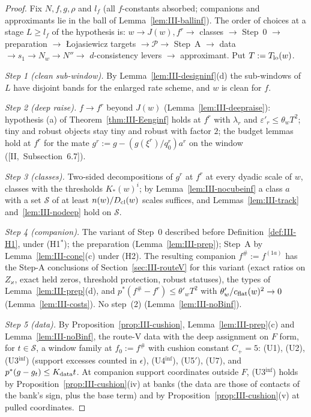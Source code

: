\documentclass[10pt]{amsart}
\theoremstyle{definition}
\theoremstyle{remark}
\begin{document}
\begin{proof}
Fix $N,f,g,\rho$ and $l_f$ (all $f$-constants absorbed; companions and
approximants lie in the ball of Lemma~\ref{lem:III-ballinf}).  The order of
choices at a stage $L\ge l_f$ of the hypothesis is: $w\to J(w),f^r\to$ classes
$\to$ Step~0 $\to$ preparation $\to$ \L ojasiewicz targets $\to\mathcal P\to$
Step~A $\to$ data $\to s_1\to N_w\to N''\to$ $d$-consistency levers $\to$
approximant.  Put $T:=T_{\rm lo}(w)$.

\emph{Step 1 (clean sub-window).}  By Lemma~\ref{lem:III-designinf}(d) the
sub-windows of $L$ have disjoint bands for the enlarged rate scheme, and $w$
is clean for $f$.

\emph{Step 2 (deep raise).}  $f\to f^r$ beyond $J(w)$
(Lemma~\ref{lem:III-deepraise}): hypothesis (a) of
Theorem~\ref{thm:III-Eenginf} holds at $f^r$ with $\lambda_r$ and
$\varepsilon'_r\le\theta_wT^2$; tiny and robust objects stay tiny and robust
with factor $2$; the budget lemmas hold at $f^r$ for the mate
$g^r:=g-(g(\xi^r)/q^r_0)a^r$ on the window ([II,~Subsection~6.7]).

\emph{Step 3 (classes).}  Two-sided decompositions of $g^r$ at $f^r$ at every
dyadic scale of $w$, classes with the thresholds $K_*(w)^i$; by
Lemma~\ref{lem:III-nocubeinf} a class $a$ with a set $\mathcal S$ of at least
$n(w)/D_{\rm cl}(w)$ scales suffices, and Lemmas~\ref{lem:III-track}
and~\ref{lem:III-nodeep} hold on $\mathcal S$.

\emph{Step 4 (companion).}  The variant of Step~0 described before
Definition~\ref{def:III-H1}, under (H1$^*$); the preparation
(Lemma~\ref{lem:III-prep}); Step~A by Lemma~\ref{lem:III-cone}(c) under (H2).
The resulting companion $f^\#:=f^{(1a)}$ has the Step-A conclusions of
Section~\ref{sec:III-routeV} for this variant (exact ratios on $Z_\varkappa$, exact held zeros,
threshold protection, robust statuses), the types of Lemma~\ref{lem:III-prep}(d),
and $p^*(f^\#-f^r)\le\theta'_wT^2$ with $\theta'_w/c_{\rm flat}(w)^2\to0$
(Lemma~\ref{lem:III-costs}).  No step~(2) (Lemma~\ref{lem:III-noBinf}).

\emph{Step 5 (data).}  By Proposition~\ref{prop:III-cushion},
Lemma~\ref{lem:III-prep}(c) and Lemma~\ref{lem:III-noBinf}, the route-V data with
the deep assignment on $F$ form, for $t\in\mathcal S$, a window family at
$f_0:=f^\#$ with cushion constant $C_+=5$: (U1), (U2), (U3$^{\inf}$)
(support excesses counted in $\epsilon$), (U4$^{\inf}$), (U5$'$), (U7), and
$p^*(g-g_t)\le K_{\rm data}t$.  At companion support coordinates outside $F$,
(U3$^{\inf}$) holds by Proposition~\ref{prop:III-cushion}(iv) at banks (the
data are those of contacts of the bank's sign, plus the base term) and by
Proposition~\ref{prop:III-cushion}(v) at pulled coordinates.


\end{proof}
\end{document}

